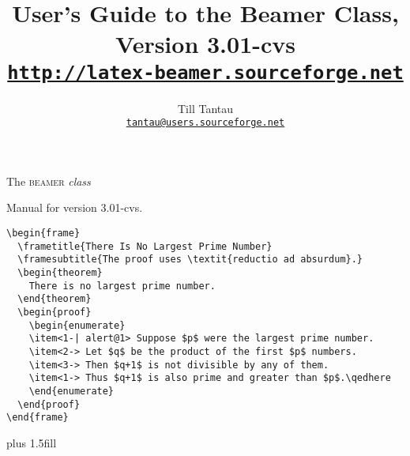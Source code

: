 \documentclass{ltxdoc}
\def\version{3.01-cvs}
\begin{document}
{
  \parindent0pt
\vbox{}
\vskip 3.5cm
\Huge
The \textsc{beamer} \textit{class}

\Large
Manual for version \version.
\vskip 3cm

\normalsize
\begin{verbatim}
\begin{frame}
  \frametitle{There Is No Largest Prime Number}
  \framesubtitle{The proof uses \textit{reductio ad absurdum}.}
  \begin{theorem}
    There is no largest prime number.
  \end{theorem}
  \begin{proof}
    \begin{enumerate}
    \item<1-| alert@1> Suppose $p$ were the largest prime number.
    \item<2-> Let $q$ be the product of the first $p$ numbers.
    \item<3-> Then $q+1$ is not divisible by any of them.
    \item<1-> Thus $q+1$ is also prime and greater than $p$.\qedhere
    \end{enumerate}      
  \end{proof}
\end{frame}
\end{verbatim}
\qquad{}
\vskip 0cm plus 1.5fill
\vbox{}         
\clearpage
}


\title{User's Guide to the Beamer Class, Version \version\\
\Large\href{http://latex-beamer.sourceforge.net}{\texttt{http://latex-beamer.sourceforge.net}}}
\author{Till Tantau\\
  \href{mailto:tantau@users.sourceforge.net}{\texttt{tantau@users.sourceforge.net}}}

\maketitle

\tableofcontents



\end{document}
